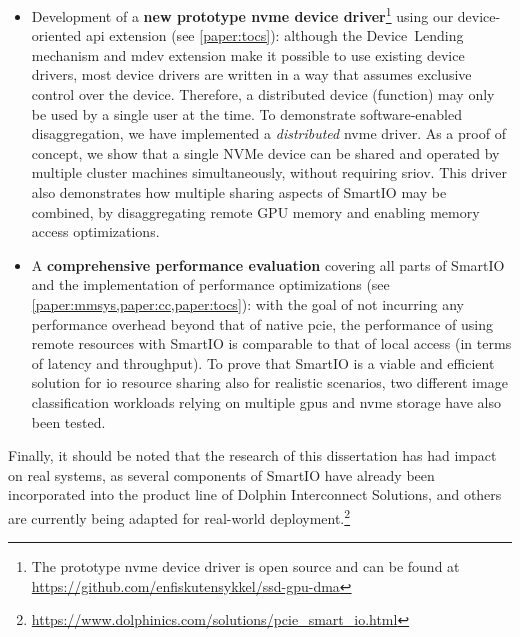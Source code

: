 \begin{itemize}
    \item Development of a \textbf{new prototype \gls{nvme} device driver}\footnote{The prototype \gls{nvme} device driver is open source and can be found at \mbox{\url{https://github.com/enfiskutensykkel/ssd-gpu-dma}}} using our device-oriented \gls{api} extension (see \cref{paper:tocs}):
        although the Device~Lending mechanism and \gls{mdev} extension make it possible to use existing device drivers, most device drivers are written in a way that assumes exclusive control over the device. Therefore, a distributed device (\gls{function}) may only be used by a single user at the time.
    To demonstrate software-enabled \gls{disaggregation}, we have implemented a \emph{distributed} \gls{nvme} driver. 
    As a proof of concept, we show that a single NVMe device can be shared and operated by multiple cluster machines simultaneously, without requiring \gls{sriov}.
	This driver also demonstrates how multiple sharing aspects of SmartIO may be combined, 
	by \gls{disaggregating} remote GPU memory and enabling memory access optimizations.

    \item A \textbf{comprehensive performance evaluation} covering all parts of SmartIO and the implementation of performance optimizations (see \cref{paper:mmsys,paper:cc,paper:tocs}):
        with the goal of not incurring any performance overhead beyond that of native \gls{pcie}, the performance of using remote resources with SmartIO is comparable to that of local access (in terms of latency and throughput).
        To prove that SmartIO is a viable and efficient solution for \gls{io} resource sharing also for realistic scenarios, two different image classification workloads relying on multiple \glspl{gpu} and \gls{nvme} storage have also been tested.
	
\end{itemize}
%
Finally, it should be noted that the research of this dissertation has had impact on real systems, as several components of SmartIO have already been incorporated into the product line of Dolphin Interconnect Solutions, and others are currently being adapted for real-world deployment.\footnote{{\url{https://www.dolphinics.com/solutions/pcie_smart_io.html}}}


